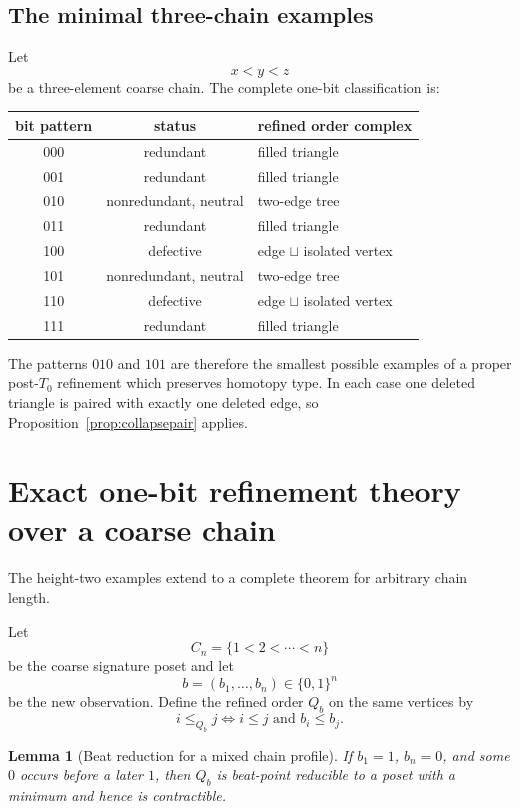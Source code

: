\documentclass[11pt]{article}
\newtheorem{lemma}[theorem]{Lemma}
\theoremstyle{definition}
\begin{document}
\subsection{The minimal three-chain examples}

Let
\[
x<y<z
\]
be a three-element coarse chain. The complete one-bit classification is:

\begin{center}
\begin{tabular}{ccl}
\toprule
bit pattern & status & refined order complex \\
\midrule
000 & redundant & filled triangle \\
001 & redundant & filled triangle \\
010 & nonredundant, neutral & two-edge tree \\
011 & redundant & filled triangle \\
100 & defective & edge $\sqcup$ isolated vertex \\
101 & nonredundant, neutral & two-edge tree \\
110 & defective & edge $\sqcup$ isolated vertex \\
111 & redundant & filled triangle \\
\bottomrule
\end{tabular}
\end{center}

The patterns $010$ and $101$ are therefore the smallest possible examples of a proper post-$T_0$ refinement which preserves homotopy type. In each case one deleted triangle is paired with exactly one deleted edge, so Proposition~\ref{prop:collapsepair} applies.

\section{Exact one-bit refinement theory over a coarse chain}

The height-two examples extend to a complete theorem for arbitrary chain length.

Let
\[
C_n=\{1<2<\cdots<n\}
\]
be the coarse signature poset and let
\[
b=(b_1,\dots,b_n)\in\{0,1\}^n
\]
be the new observation. Define the refined order $Q_b$ on the same vertices by
\begin{equation}\label{eq:chainfine}
i\le_{Q_b}j
\iff
i\le j\text{ and }b_i\le b_j.
\end{equation}

\begin{lemma}[Beat reduction for a mixed chain profile]\label{lem:beatchain}
If $b_1=1$, $b_n=0$, and some $0$ occurs before a later $1$, then $Q_b$ is beat-point reducible to a poset with a minimum and hence is contractible.
\end{lemma}
\end{document}
